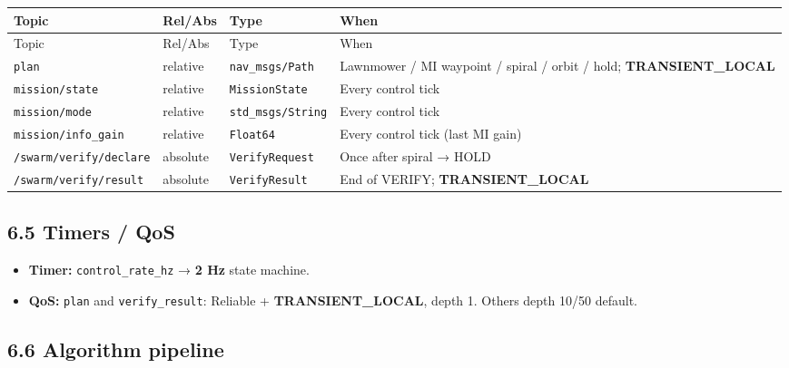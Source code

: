 \begin{center}
\small
\begin{longtable}{@{}lllp{5.2cm}@{}}
\toprule
Topic & Rel/Abs & Type & When \\
\midrule
\endfirsthead
\toprule
Topic & Rel/Abs & Type & When \\
\midrule
\endhead
\texttt{plan} & relative & \texttt{nav\_msgs/Path} & Lawnmower / MI waypoint / spiral / orbit / hold; \textbf{TRANSIENT\_LOCAL} \\
\texttt{mission/state} & relative & \texttt{MissionState} & Every control tick \\
\texttt{mission/mode} & relative & \texttt{std\_msgs/String} & Every control tick \\
\texttt{mission/info\_gain} & relative & \texttt{Float64} & Every control tick (last MI gain) \\
\texttt{/swarm/verify/declare} & absolute & \texttt{VerifyRequest} & Once after spiral → HOLD \\
\texttt{/swarm/verify/result} & absolute & \texttt{VerifyResult} & End of VERIFY; \textbf{TRANSIENT\_LOCAL} \\
\bottomrule
\end{longtable}
\end{center}


\subsection{6.5 Timers / QoS}


\begin{itemize}[leftmargin=*]
\item \textbf{Timer:} \texttt{control\_rate\_hz} → \textbf{2 Hz} state machine.
\item \textbf{QoS:} \texttt{plan} and \texttt{verify\_result}: Reliable + \textbf{TRANSIENT\_LOCAL}, depth 1. Others depth 10/50 default.
\end{itemize}


\subsection{6.6 Algorithm pipeline}


